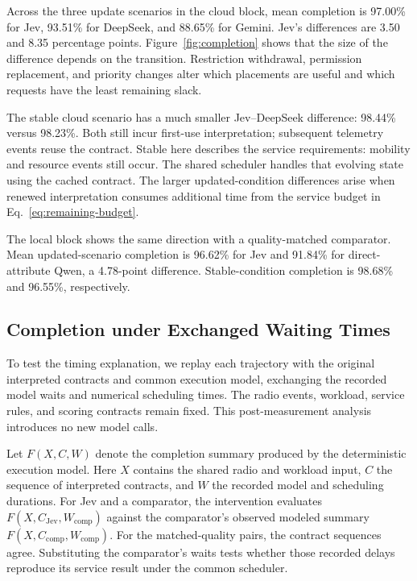 Across the three update scenarios in the cloud block, mean completion is 97.00\% for Jev, 93.51\% for DeepSeek, and 88.65\% for Gemini. Jev's differences are 3.50 and 8.35 percentage points. Figure~\ref{fig:completion} shows that the size of the difference depends on the transition. Restriction withdrawal, permission replacement, and priority changes alter which placements are useful and which requests have the least remaining slack.

The stable cloud scenario has a much smaller Jev--DeepSeek difference: 98.44\% versus 98.23\%. Both still incur first-use interpretation; subsequent telemetry events reuse the contract. Stable here describes the service requirements: mobility and resource events still occur. The shared scheduler handles that evolving state using the cached contract. The larger updated-condition differences arise when renewed interpretation consumes additional time from the service budget in Eq.~\eqref{eq:remaining-budget}.

The local block shows the same direction with a quality-matched comparator. Mean updated-scenario completion is 96.62\% for Jev and 91.84\% for direct-attribute Qwen, a 4.78-point difference. Stable-condition completion is 98.68\% and 96.55\%, respectively.

\subsection{Completion under Exchanged Waiting Times}
\label{sec:intervention}
To test the timing explanation, we replay each trajectory with the original interpreted contracts and common execution model, exchanging the recorded model waits and numerical scheduling times. The radio events, workload, service rules, and scoring contracts remain fixed. This post-measurement analysis introduces no new model calls.

Let $F(X,C,W)$ denote the completion summary produced by the deterministic execution model. Here $X$ contains the shared radio and workload input, $C$ the sequence of interpreted contracts, and $W$ the recorded model and scheduling durations. For Jev and a comparator, the intervention evaluates $F(X,C_{\mathrm{Jev}},W_{\mathrm{comp}})$ against the comparator's observed modeled summary $F(X,C_{\mathrm{comp}},W_{\mathrm{comp}})$. For the matched-quality pairs, the contract sequences agree. Substituting the comparator's waits tests whether those recorded delays reproduce its service result under the common scheduler.

